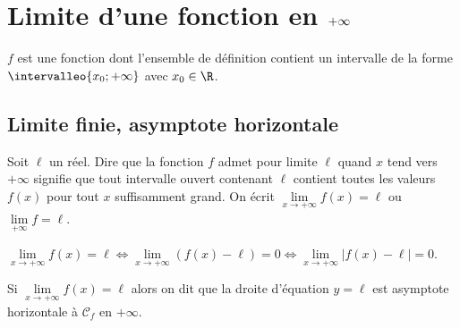 \section{Limite d'une fonction en $\boldmath{+\infty}$}

\begin{centered}
$f$ est une fonction dont l'ensemble de définition contient un intervalle de la forme $\intervalleo{x_0;+\infty}$ avec $x_0\in\R$.
\end{centered}

	\subsection{Limite finie, asymptote horizontale}

\begin{dfn}
Soit $\ell$ un réel. Dire que la fonction $f$ admet pour limite $\ell$ quand $x$ tend vers $+\infty$ signifie que tout intervalle ouvert contenant $\ell$ contient toutes les valeurs $f(x)$ pour tout $x$ suffisamment grand.\newline
On écrit $\lim\limits_{x\to +\infty} f(x)=\ell$ ou $ \lim\limits_{+\infty} f=\ell$.
\end{dfn}

\begin{prp}
$ \lim\limits_{x\to +\infty}f(x)=\ell \Longleftrightarrow \lim\limits_{x\to +\infty}\left( f(x)-\ell\right)=0 \Longleftrightarrow \lim\limits_{x\to +\infty}\lvert f(x)-\ell\rvert=0$.
\end{prp}

\begin{dfn}
Si $ \lim\limits_{x\to +\infty} f(x)=\ell$ alors on dit que la droite d'équation $y=\ell$ est asymptote horizontale à $\mathcal C_f$ en $+\infty$.
\end{dfn}

